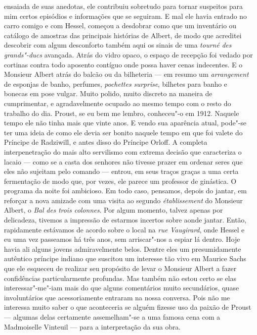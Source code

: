 ensaiada de suas anedotas, ele contribuiu sobretudo para tornar
suspeitos para mim certos episódios e informações que se seguiram. E mal
ele havia entrado no carro comigo e com Hessel, começou a desdobrar como
que um inventário ou catálogo de amostras das principais histórias de
Albert, de modo que acreditei descobrir com algum desconforto também
aqui os sinais de uma \emph{tourné des grands"-ducs} avançada. Atrás do
vidro opaco, o espaço de recepção foi vedado por cortinas contra todo
aposento contíguo onde possa haver cenas indecentes. E o Monsieur Albert
atrás do balcão ou da bilheteria --- em resumo um \emph{arrangement} de
esponjas de banho, perfumes, \emph{pochettes surprise}, bilhetes para
banho e bonecas em pose vulgar. Muito polido, muito discreto na maneira
de cumprimentar, e agradavelmente ocupado ao mesmo tempo com o resto do
trabalho do dia. Proust, se eu bem me lembro, conheceu"-o em 1912.
Naquele tempo ele não tinha mais que vinte anos. E vendo sua aparência
atual, pode"-se ter uma ideia de como ele devia ser bonito naquele tempo
em que foi valete do Príncipe de Radziwill, e antes disso do Príncipe
Orloff. A completa interpenetração do mais alto servilismo com extrema
decisão que caracteriza o lacaio --- como se a casta dos senhores não
tivesse prazer em ordenar seres que eles não sujeitam pelo comando ---
entrou, em seus traços graças a uma certa fermentação de modo que, por
vezes, ele parece um professor de ginástica. O programa da noite foi
ambicioso. Em todo caso, pensamos, depois do jantar, em reforçar a nova
amizade com uma visita ao segundo \emph{établissement} do Monsieur
Albert, o \emph{Bal des trois colonnes}. Por algum momento, talvez
apenas por delicadeza, tivemos a impressão de estarmos incertos sobre
aonde jantar. Então, rapidamente estávamos de acordo sobre o local na
\emph{rue Vaugirard}, onde Hessel e eu uma vez passeamos há três anos,
sem arriscar"-nos a espiar lá dentro. Hoje havia ali alguns jovens
admiravelmente belos. Dentre eles um presumidamente autêntico príncipe
indiano que suscitou um interesse tão vivo em Maurice Sachs que ele
esqueceu de realizar seu propósito de levar o Monsieur Albert a fazer
confidências particularmente profundas. Mas também não estou certo se
elas interessar"-me"-iam mais do que alguns comentários muito secundários,
quase involuntários que acessoriamente entraram na nossa conversa. Pois
não me interessa muito saber o que aconteceria se alguém fizesse uso da
paixão de Proust --- algumas delas certamente assemelham"-se a uma famosa
cena com a Madmoiselle Vinteuil --- para a interpretação da sua obra.
